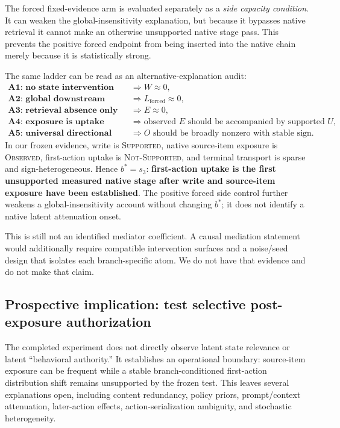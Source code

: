 The forced fixed-evidence arm is evaluated separately as a \emph{side capacity condition}. It can weaken the global-insensitivity explanation, but because it bypasses native retrieval it cannot make an otherwise unsupported native stage pass. This prevents the positive forced endpoint from being inserted into the native chain merely because it is statistically strong.

The same ladder can be read as an alternative-explanation audit:
\begin{align*}
\textbf{A1: no state intervention} &\Rightarrow W\approx 0,\\
\textbf{A2: global downstream insensitivity} &\Rightarrow L_{\mathrm{forced}}\approx 0,\\
\textbf{A3: retrieval absence only} &\Rightarrow E\approx 0,\\
\textbf{A4: exposure is uptake} &\Rightarrow \text{observed }E\text{ should be accompanied by supported }U,\\
\textbf{A5: universal directional transport} &\Rightarrow O\text{ should be broadly nonzero with stable sign.}
\end{align*}
In our frozen evidence, write is \textsc{Supported}, native source-item exposure is \textsc{Observed}, first-action uptake is \textsc{Not-Supported}, and terminal transport is sparse and sign-heterogeneous. Hence $b^*=s_3$: \textbf{first-action uptake is the first unsupported measured native stage after write and source-item exposure have been established}. The positive forced side control further weakens a global-insensitivity account without changing $b^*$; it does not identify a native latent attenuation onset.

This is still not an identified mediator coefficient. A causal mediation statement would additionally require compatible intervention surfaces and a noise/seed design that isolates each branch-specific atom. We do not have that evidence and do not make that claim.

\subsection{Prospective implication: test selective post-exposure authorization}
The completed experiment does not directly observe latent state relevance or latent ``behavioral authority.'' It establishes an operational boundary: source-item exposure can be frequent while a stable branch-conditioned first-action distribution shift remains unsupported by the frozen test. This leaves several explanations open, including content redundancy, policy priors, prompt/context attenuation, later-action effects, action-serialization ambiguity, and stochastic heterogeneity.

